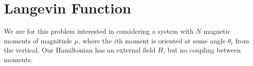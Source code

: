\documentclass[../../PS3.tex]{subfiles}
\begin{document}
\section{Langevin Function}

We are for this problem interested in considering a system with $N$ magnetic moments of magnitude $\mu$, where the $i$th moment is oriented at some angle $\theta_i$ from the vertical. Our Hamiltonian has an external field $H$, but no coupling between moments.
\end{document}
